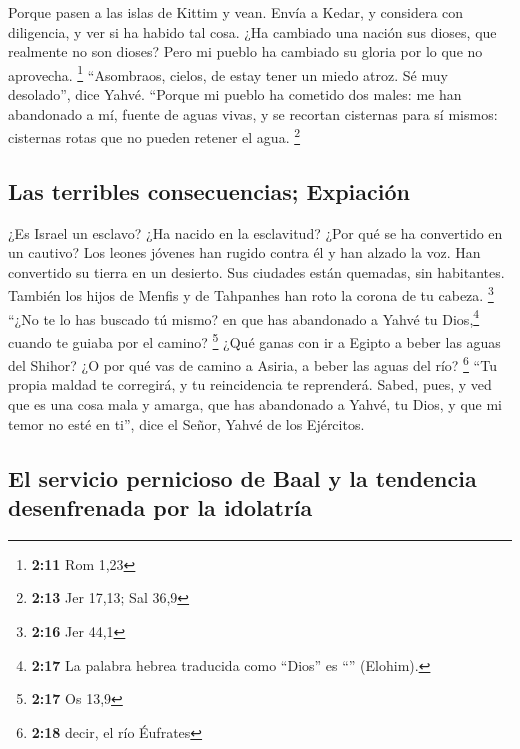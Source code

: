  Porque pasen a las islas de Kittim y vean. Envía a
Kedar, y considera con diligencia, y ver si ha habido tal cosa.
 ¿Ha cambiado una nación sus dioses, que realmente no son
dioses? Pero mi pueblo ha cambiado su gloria por lo que no aprovecha.
\footnote{\textbf{2:11} Rom 1,23}  ``Asombraos, cielos,
de estay tener un miedo atroz. Sé muy desolado'', dice Yahvé.
 ``Porque mi pueblo ha cometido dos males: me han
abandonado a mí, fuente de aguas vivas, y se recortan cisternas para sí
mismos: cisternas rotas que no pueden retener el agua. \footnote{\textbf{2:13}
  Jer 17,13; Sal 36,9}

\hypertarget{las-terribles-consecuencias-expiaciuxf3n}{%
\subsection{Las terribles consecuencias;
Expiación}\label{las-terribles-consecuencias-expiaciuxf3n}}

 ¿Es Israel un esclavo? ¿Ha nacido en la esclavitud? ¿Por
qué se ha convertido en un cautivo?  Los leones jóvenes
han rugido contra él y han alzado la voz. Han convertido su tierra en un
desierto. Sus ciudades están quemadas, sin habitantes. 
También los hijos de Menfis y de Tahpanhes han roto la corona de tu
cabeza. \footnote{\textbf{2:16} Jer 44,1}  ``¿No te lo
has buscado tú mismo? en que has abandonado a Yahvé tu Dios,\footnote{\textbf{2:17}
  La palabra hebrea traducida como ``Dios'' es ``''
  (Elohim).} cuando te guiaba por el camino? \footnote{\textbf{2:17} Os
  13,9}  ¿Qué ganas con ir a Egipto a beber las aguas del
Shihor? ¿O por qué vas de camino a Asiria, a beber las aguas del río?
\footnote{\textbf{2:18} decir, el río Éufrates}  ``Tu
propia maldad te corregirá, y tu reincidencia te reprenderá. Sabed,
pues, y ved que es una cosa mala y amarga, que has abandonado a Yahvé,
tu Dios, y que mi temor no esté en ti'', dice el Señor, Yahvé de los
Ejércitos.

\hypertarget{el-servicio-pernicioso-de-baal-y-la-tendencia-desenfrenada-por-la-idolatruxeda}{%
\subsection{El servicio pernicioso de Baal y la tendencia desenfrenada
por la
idolatría}\label{el-servicio-pernicioso-de-baal-y-la-tendencia-desenfrenada-por-la-idolatruxeda}}

